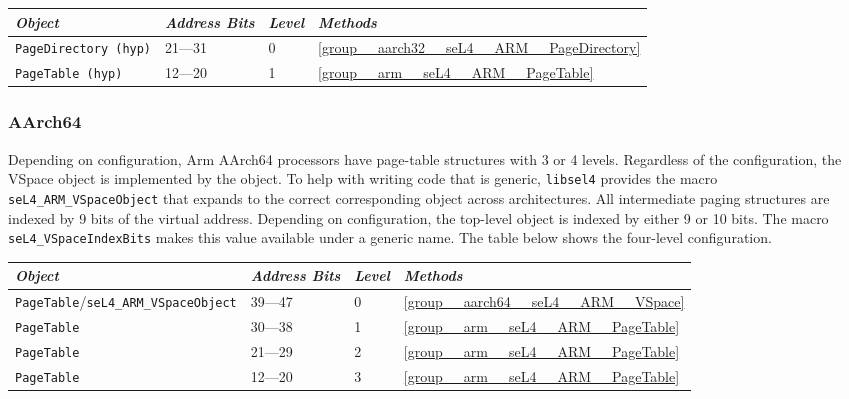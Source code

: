 \begin{tabularx}{\textwidth}{Xlll} \toprule
  \emph{Object}          & \emph{Address Bits} & \emph{Level} & \emph{Methods} \\ \midrule
  \texttt{PageDirectory (hyp)} & 21---31     & 0            & \autoref{group__aarch32__seL4__ARM__PageDirectory} \\
  \texttt{PageTable (hyp)}     & 12---20     & 1            & \autoref{group__arm__seL4__ARM__PageTable} \\
  \bottomrule
\end{tabularx}

\subsubsection{AArch64}

Depending on configuration, Arm AArch64 processors have page-table structures with 3 or 4 levels.
Regardless of the configuration, the VSpace object is implemented by the  object.
To help with writing code that is generic, \texttt{libsel4} provides the macro \texttt{seL4\_ARM\_VSpaceObject}
that expands to the correct corresponding object across architectures. All intermediate paging
structures are indexed by 9 bits of the virtual address. Depending on configuration, the
top-level object is indexed by either 9 or 10 bits. The macro \texttt{seL4\_VSpaceIndexBits}
makes this value available under a generic name. The table below shows the four-level configuration.

\begin{tabularx}{\textwidth}{Xlll} \toprule
\emph{Object}                    & \emph{Address Bits} & \emph{Level} & \emph{Methods} \\ \midrule
    \texttt{PageTable}/\texttt{seL4\_ARM\_VSpaceObject}
                                 & 39---47             & 0            & \autoref{group__aarch64__seL4__ARM__VSpace} \\
    \texttt{PageTable}           & 30---38             & 1            & \autoref{group__arm__seL4__ARM__PageTable} \\
    \texttt{PageTable}           & 21---29             & 2            & \autoref{group__arm__seL4__ARM__PageTable} \\
    \texttt{PageTable}           & 12---20             & 3            & \autoref{group__arm__seL4__ARM__PageTable} \\
\bottomrule
\end{tabularx}

